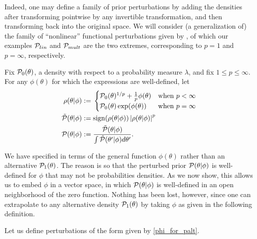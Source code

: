 Indeed, one may define a family of prior perturbations by adding the densities
after transforming pointwise by any invertible transformation, and then
transforming back into the original space.  We will consider (a generalization
of) the family of ``nonlinear'' functional perturbations given by
\citep{gustafson:1996:local}, of which our examples $\mathcal{P}_{lin}$ and $\mathcal{P}_{mult}$
are the two extremes, corresponding to $p=1$ and $p=\infty$, respectively.

\begin{defn}
%
Fix $\mathcal{P}_{0}(\theta)$, a density with respect to a probability measure $\lambda$,
and fix $1 \le p \le \infty$.  For any $\phi(\theta)$ for which the expressions
are well-defined, let
%
\begin{align*}
%
\rho(\theta \vert \phi) :={}& \begin{cases}
%
\pbase(\theta)^{1/p} + \frac{1}{p}\phi(\theta)
    & \textrm{when }p < \infty \\
\pbase(\theta)\exp(\phi(\theta))
    & \textrm{when }p = \infty
%
\end{cases}\\
%
\tilde{\p}(\theta \vert \phi) :={}&
    \mathrm{sign}(\rho(\theta \vert \phi)) \abs{\rho(\theta \vert \phi)}^p\\
\p(\theta \vert \phi) :={}&
    \frac{\tilde{\p}(\theta \vert \phi)}
         {\int \tilde{\p}(\theta' \vert \phi) d\theta'}.
%
\end{align*}
%
\end{defn}
%

We have specified  in terms of the general function
$\phi(\theta)$ rather than an alternative $\mathcal{P}_{1}(\theta)$.  The reason is so
that the perturbed prior $\mathcal{P}(\theta \vert \phi)$ is well-defined for $\phi$ that
may not be probabilities densities.  As we now show, this allows us to embed
$\phi$ in a vector space, in which $\mathcal{P}(\theta \vert \phi)$ is well-defined in an
open neighborhood of the zero function.  Nothing has been lost, however, since
one can extrapolate to any alternative density $\mathcal{P}_{1}(\theta)$ by taking
$\phi$ as given in the following definition.

Let us define perturbations of the form given by \eqref{phi_for_palt}.


